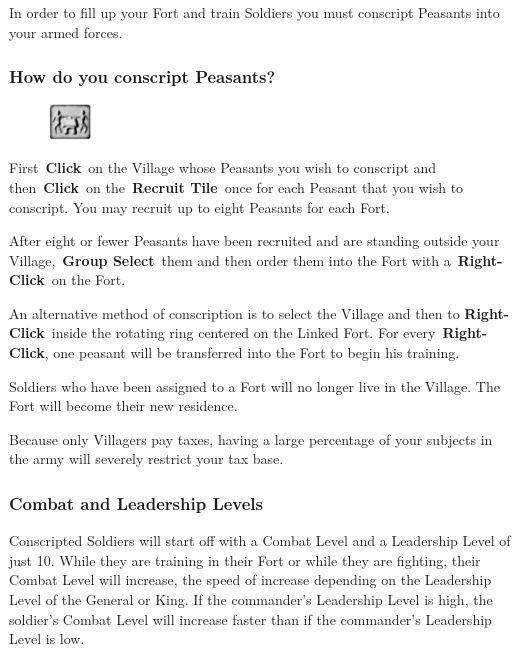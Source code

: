 In order to fill up your Fort and train Soldiers you must conscript Peasants into your armed forces.

\subsubsection{How do you conscript Peasants?}

\begin{figure}
	\vspace{-20pt}
	\begin{center}
		\includegraphics[width=0.1\textwidth]{Trecruit}
	\end{center}
	\vspace{-20pt}
\end{figure}

First \textbf{Click} on the Village whose Peasants you wish to conscript and then \textbf{Click} on the \textbf{Recruit Tile} once for each Peasant that you wish to conscript. You may recruit up to eight Peasants for each Fort.

After eight or fewer Peasants have been recruited and are standing outside your Village, \textbf{Group Select} them and then order them into the Fort with a \textbf{Right-Click} on the Fort.

An alternative method of conscription is to select the Village and then to \textbf{Right-Click} inside the rotating ring centered on the Linked Fort. For every \textbf{Right-Click}, one peasant will be transferred into the Fort to begin his training.

Soldiers who have been assigned to a Fort will no longer live in the Village. The Fort will become their new residence.

Because only Villagers pay taxes, having a large percentage of your subjects in the army will severely restrict your tax base.

\subsubsection{Combat and Leadership Levels}

Conscripted Soldiers will start off with a Combat Level and a Leadership Level of just 10. While they are training in their Fort or while they are fighting, their Combat Level will increase, the speed of increase depending on the Leadership Level of the General or King. If the commander’s Leadership Level is high, the soldier’s Combat Level will increase faster than if the commander’s Leadership Level is low.

